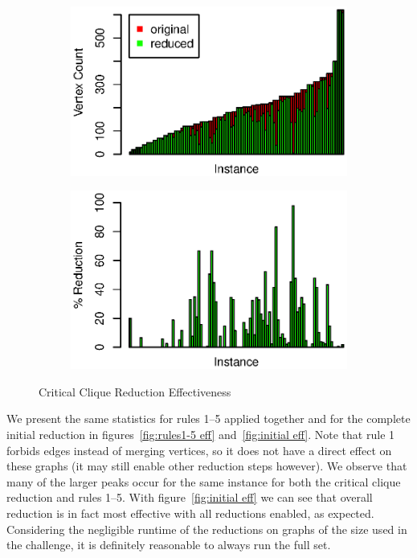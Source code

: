 \documentclass{article}
\theoremstyle{definition}
\begin{document}
\begin{figure}[h]
	\begin{subfigure}{0.49\textwidth}
		\includegraphics[width=1.0\linewidth]{crit_cliques_absolute}
	\end{subfigure}
	\begin{subfigure}{0.49\textwidth}
		\includegraphics[width=1.0\linewidth]{crit_cliques_percent}
	\end{subfigure}
	\caption{Critical Clique Reduction Effectiveness}
	\label{fig:crit_clique eff}
\end{figure}

We present the same statistics for rules 1--5 applied together and for the complete initial
reduction in figures~\ref{fig:rules1-5 eff} and~\ref{fig:initial eff}. Note that rule 1 forbids
edges instead of merging vertices, so it does not have a direct effect on these graphs (it may still
enable other reduction steps however). We observe that many of the larger peaks occur for the same
instance for both the critical clique reduction and rules 1--5. With figure~\ref{fig:initial eff} we
can see that overall reduction is in fact most effective with all reductions enabled, as expected.
Considering the negligible runtime of the reductions on graphs of the size used in the challenge, it
is definitely reasonable to always run the full set.
\end{document}
